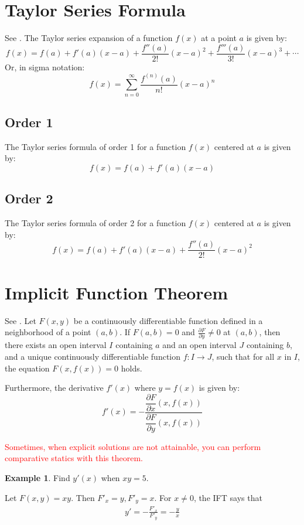 \documentclass[11pt,a4paper]{book}
\newcommand{\red}[1]{\textcolor{red}{#1}}
\theoremstyle{definition}\newtheorem{definition}{Definition}
\theoremstyle{definition}\newtheorem{fact}{Fact}
\theoremstyle{definition}\newtheorem{remark}{Remark}
\theoremstyle{definition}\newtheorem{ex}{Ex.}
\theoremstyle{definition}\newtheorem{project}{Project}
\theoremstyle{definition}\newtheorem{problem}{Problem}
\theoremstyle{definition}\newtheorem{example}{Example}
\numberwithin{theorem}{section}
\numberwithin{corollary}{chapter}
\numberwithin{assumption}{chapter}
\numberwithin{definition}{chapter}
\numberwithin{prop}{chapter}
\numberwithin{notation}{chapter}
\numberwithin{problem}{chapter}
\numberwithin{example}{chapter}
\numberwithin{fact}{chapter}
\numberwithin{ex}{chapter}
\begin{document}
\begin{appendices}
	\section{Taylor Series Formula}
	See \citet[Ch. 6.6]{springcamp}. The Taylor series expansion of a function $f(x)$ at a point $a$ is given by:
	\[
	f(x) = f(a) + f'(a)(x - a) + \frac{f''(a)}{2!}(x - a)^2 + \frac{f'''(a)}{3!}(x - a)^3 + \dotsb
	\]
	Or, in sigma notation:
	\[
	f(x) = \sum_{n=0}^{\infty} \frac{f^{(n)}(a)}{n!}(x - a)^n
	\]
	\subsection*{Order 1}
	The Taylor series formula of order 1 for a function $f(x)$ centered at $a$ is given by:
	\[
	f(x) = f(a) + f'(a)(x - a)
	\]
	
	\subsection*{Order 2}
	The Taylor series formula of order 2 for a function $f(x)$ centered at $a$ is given by:
	\[
	f(x) = f(a) + f'(a)(x - a) + \frac{f''(a)}{2!}(x - a)^2
	\]
	
	\section{Implicit Function Theorem}
	See \citet[Ch 10.6]{springcamp}. Let \( F(x, y) \) be a continuously differentiable function defined in a neighborhood of a point \( (a, b) \). If \( F(a, b) = 0 \) and \( \frac{\partial F}{\partial y} \neq 0 \) at \( (a, b) \), then there exists an open interval \( I \) containing \( a \) and an open interval \( J \) containing \( b \), and a unique continuously differentiable function \( f : I \to J \), such that for all \( x \) in \( I \), the equation \( F(x, f(x)) = 0 \) holds.
	
	Furthermore, the derivative \( f'(x) \) where $y = f(x)$ is given by:
	\[ f'(x) = -\dfrac{\dfrac{\partial F}{\partial x}(x, f(x))}{\dfrac{\partial F}{\partial y}(x, f(x))} \]
	
	\red{Sometimes, when explicit solutions are not attainable, you can perform comparative statics with this theorem.} 	
	\begin{example}
		Find $y'(x)$ when $xy=5$.
		
		Let $F(x,y) = xy$. Then $F'_x = y, F'_y = x$. For $x\neq 0$, the IFT says that
		\begin{align*}
			y' = - \frac{F'_x}{F'_y} = - \frac{y}{x} 
		\end{align*}
	\end{example}
	

\end{appendices}
\end{document}
